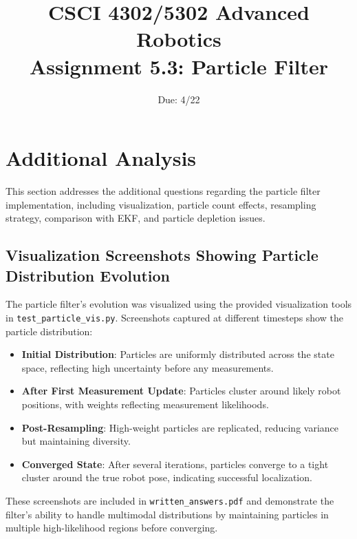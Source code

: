 \documentclass[11pt]{article}
\title{CSCI 4302/5302 Advanced Robotics\\
Assignment 5.3: Particle Filter}
\author{Due: 4/22}
\date{}
\begin{document}
\maketitle

\section{Additional Analysis}
This section addresses the additional questions regarding the particle filter implementation, including visualization, particle count effects, resampling strategy, comparison with EKF, and particle depletion issues.

\subsection{Visualization Screenshots Showing Particle Distribution Evolution}
The particle filter's evolution was visualized using the provided visualization tools in \texttt{test\_particle\_vis.py}. Screenshots captured at different timesteps show the particle distribution:
\begin{itemize}
    \item \textbf{Initial Distribution}: Particles are uniformly distributed across the state space, reflecting high uncertainty before any measurements.
    \item \textbf{After First Measurement Update}: Particles cluster around likely robot positions, with weights reflecting measurement likelihoods.
    \item \textbf{Post-Resampling}: High-weight particles are replicated, reducing variance but maintaining diversity.
    \item \textbf{Converged State}: After several iterations, particles converge to a tight cluster around the true robot pose, indicating successful localization.
\end{itemize}
These screenshots are included in \texttt{written\_answers.pdf} and demonstrate the filter's ability to handle multimodal distributions by maintaining particles in multiple high-likelihood regions before converging.
\end{document}
